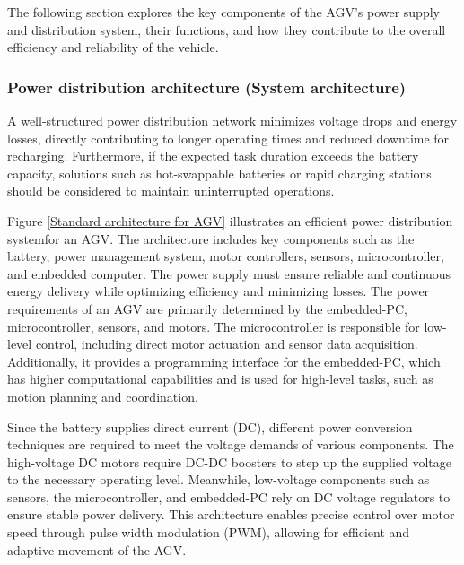 \documentclass[../../main]{subfiles}
\begin{document}
The following section explores the key components of the AGV's 
power supply and distribution system, their functions, and how 
they contribute to the overall efficiency and reliability of the vehicle.

\subsubsection{Power distribution architecture (System architecture)}

A well-structured power distribution network minimizes voltage drops and energy 
losses, directly contributing to longer operating times and reduced 
downtime for recharging. Furthermore, if the expected task duration 
exceeds the battery capacity, solutions such as hot-swappable 
batteries or rapid charging stations should be considered to maintain 
uninterrupted operations.

Figure \ref{Standard architecture for AGV} illustrates an efficient 
power distribution system\cite{system_architecture}for an AGV. The architecture 
includes key components such as the battery, 
power management system, motor controllers, sensors, 
microcontroller, and embedded computer. The power 
supply must ensure reliable and continuous energy 
delivery while optimizing efficiency and minimizing losses.
The power requirements of an AGV are primarily determined by 
the embedded-PC, microcontroller, sensors, and motors. 
The microcontroller is responsible for low-level control, 
including direct motor actuation and sensor data acquisition. 
Additionally, it provides a programming interface for the 
embedded-PC, which has higher computational capabilities 
and is used for high-level tasks, such as motion planning 
and coordination.

Since the battery supplies direct current (DC), different 
power conversion techniques are required to meet the voltage 
demands of various components. The high-voltage DC motors 
require DC-DC boosters to step up the supplied voltage to 
the necessary operating level. Meanwhile, low-voltage components 
such as sensors, the microcontroller, and embedded-PC rely on 
DC voltage regulators to ensure stable power delivery. 
This architecture enables precise control over motor speed 
through pulse width modulation (PWM), allowing for 
efficient and adaptive movement of the AGV.
\end{document}

